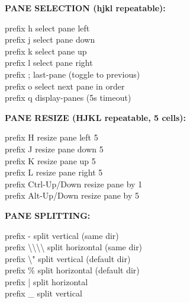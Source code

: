 \documentclass[11pt,a4paper,twoside]{book}
\begin{document}
\vspace{12pt}
{\bfseries\color{neonyellow} PANE SELECTION (hjkl repeatable):}\vspace{4pt}

\begin{codebox}
prefix h              select pane left\\
prefix j              select pane down\\
prefix k              select pane up\\
prefix l              select pane right\\
prefix ;              last-pane (toggle to previous)\\
prefix o              select next pane in order\\
prefix q              display-panes (5s timeout)\\
\end{codebox}


\vspace{12pt}
{\bfseries\color{neonyellow} PANE RESIZE (HJKL repeatable, 5 cells):}\vspace{4pt}

\begin{codebox}
prefix H              resize pane left 5\\
prefix J              resize pane down 5\\
prefix K              resize pane up 5\\
prefix L              resize pane right 5\\
prefix Ctrl-Up/Down   resize pane by 1\\
prefix Alt-Up/Down    resize pane by 5\\
\end{codebox}


\vspace{12pt}
{\bfseries\color{neonyellow} PANE SPLITTING:}\vspace{4pt}

\begin{codebox}
prefix -              split vertical (same dir)\\
prefix \textbackslash{}\textbackslash{}\textbackslash{}\textbackslash{}              split horizontal (same dir)\\
prefix \textbackslash{}"              split vertical (default dir)\\
prefix \%              split horizontal (default dir)\\
prefix |              split horizontal\\
prefix \_              split vertical\\
\end{codebox}
\end{document}
